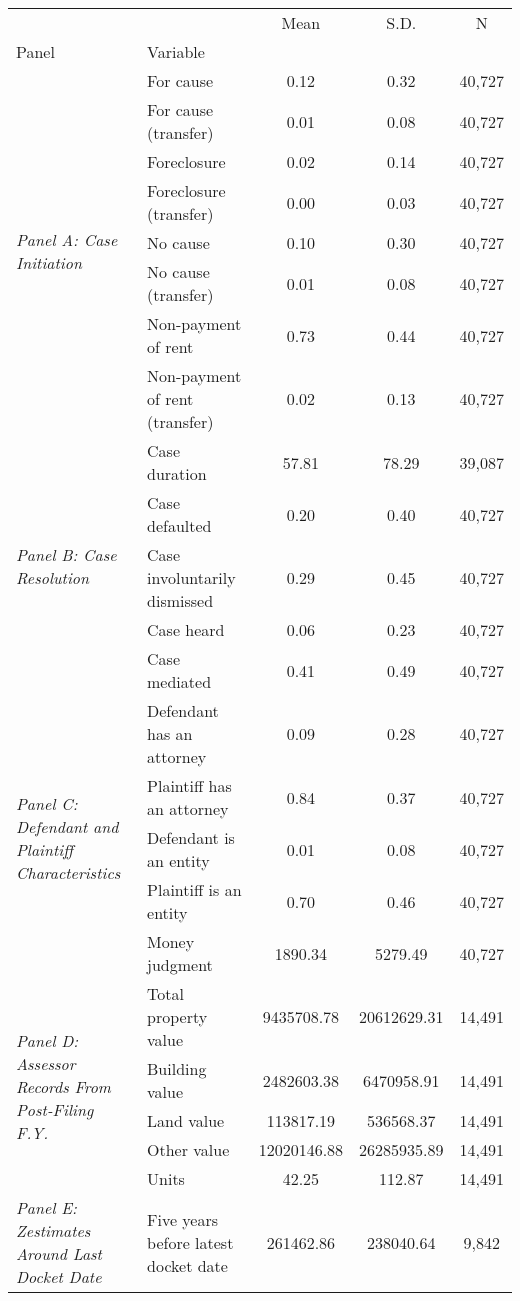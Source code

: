 \begin{tabular}{llccc}
\toprule
 &  & Mean & S.D. & N \\
Panel & Variable &  &  &  \\
\midrule
\multirow[c]{8}{4cm}{\textit{Panel A: Case Initiation}} & For cause & 0.12 & 0.32 & 40,727 \\
 & For cause (transfer) & 0.01 & 0.08 & 40,727 \\
 & Foreclosure & 0.02 & 0.14 & 40,727 \\
 & Foreclosure (transfer) & 0.00 & 0.03 & 40,727 \\
 & No cause & 0.10 & 0.30 & 40,727 \\
 & No cause (transfer) & 0.01 & 0.08 & 40,727 \\
 & Non-payment of rent & 0.73 & 0.44 & 40,727 \\
 & Non-payment of rent (transfer) & 0.02 & 0.13 & 40,727 \\
\cline{1-5}
\multirow[c]{5}{4cm}{\textit{Panel B: Case Resolution}} & Case duration & 57.81 & 78.29 & 39,087 \\
 & Case defaulted & 0.20 & 0.40 & 40,727 \\
 & Case involuntarily dismissed & 0.29 & 0.45 & 40,727 \\
 & Case heard & 0.06 & 0.23 & 40,727 \\
 & Case mediated & 0.41 & 0.49 & 40,727 \\
\cline{1-5}
\multirow[c]{5}{4cm}{\textit{Panel C: Defendant and Plaintiff Characteristics}} & Defendant has an attorney & 0.09 & 0.28 & 40,727 \\
 & Plaintiff has an attorney & 0.84 & 0.37 & 40,727 \\
 & Defendant is an entity & 0.01 & 0.08 & 40,727 \\
 & Plaintiff is an entity & 0.70 & 0.46 & 40,727 \\
 & Money judgment & 1890.34 & 5279.49 & 40,727 \\
\cline{1-5}
\multirow[c]{5}{4cm}{\textit{Panel D: Assessor Records From Post-Filing F.Y.}} & Total property value & 9435708.78 & 20612629.31 & 14,491 \\
 & Building value & 2482603.38 & 6470958.91 & 14,491 \\
 & Land value & 113817.19 & 536568.37 & 14,491 \\
 & Other value & 12020146.88 & 26285935.89 & 14,491 \\
 & Units & 42.25 & 112.87 & 14,491 \\
\cline{1-5}
\multirow[c]{9}{4cm}{\textit{Panel E: Zestimates Around Last Docket Date}} & Five years before latest docket date & 261462.86 & 238040.64 & 9,842 \\

\end{tabular}
